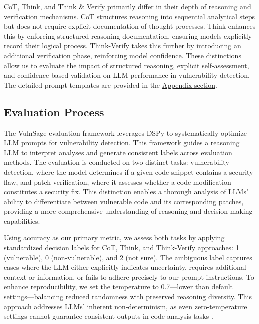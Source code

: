 \documentclass[sigconf]{acmart}
\begin{document}
CoT, Think, and Think \& Verify primarily differ in their depth of reasoning and verification mechanisms. CoT structures reasoning into sequential analytical steps but does not require explicit documentation of thought processes. Think enhances this by enforcing structured reasoning documentation, ensuring models explicitly record their logical process. Think-Verify takes this further by introducing an additional verification phase, reinforcing model confidence. These distinctions allow us to evaluate the impact of structured reasoning, explicit self-assessment, and confidence-based validation on LLM performance in vulnerability detection. The detailed prompt templates are provided in the \hyperref[appendix]{Appendix section}.

\subsection{Evaluation Process}
The VulnSage evaluation framework leverages DSPy \cite{khattab2023dspy} to systematically optimize LLM prompts for vulnerability detection. This framework guides a reasoning LLM to interpret analyses and generate consistent labels across evaluation methods. The evaluation is conducted on two distinct tasks: vulnerability detection, where the model determines if a given code snippet contains a security flaw, and patch verification, where it assesses whether a code modification constitutes a security fix. This distinction enables a thorough analysis of LLMs' ability to differentiate between vulnerable code and its corresponding patches, providing a more comprehensive understanding of reasoning and decision-making capabilities.

Using accuracy as our primary metric, we assess both tasks by applying standardized decision labels for CoT, Think, and Think-Verify approaches: 1 (vulnerable), 0 (non-vulnerable), and 2 (not sure). The ambiguous label captures cases where the LLM either explicitly indicates uncertainty, requires additional context or information, or fails to adhere precisely to our prompt instructions. To enhance reproducibility, we set the temperature to 0.7—lower than default settings—balancing reduced randomness with preserved reasoning diversity. This approach addresses LLMs' inherent non-determinism, as even zero-temperature settings cannot guarantee consistent outputs in code analysis tasks \cite{ouyang2025empirical}.
\end{document}
